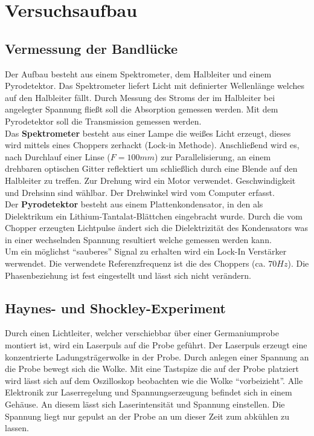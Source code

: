 \documentclass[12pt]{article}
\begin{document}
\section{Versuchsaufbau}
\subsection{Vermessung der Bandlücke}
Der Aufbau besteht aus einem Spektrometer, dem Halbleiter und einem Pyrodetektor.
Das Spektrometer liefert Licht mit definierter Wellenlänge welches auf den Halbleiter fällt. Durch Messung des Stroms der im Halbleiter bei angelegter Spannung fließt soll die Absorption gemessen werden. Mit dem Pyrodetektor soll die Transmission gemessen werden.\\

Das \textbf{Spektrometer} besteht aus einer Lampe die weißes Licht erzeugt, dieses wird mittels eines Choppers zerhackt (Lock-in Methode). Anschließend wird es, nach Durchlauf einer Linse ($F = 100mm$) zur Parallelisierung, an einem drehbaren optischen Gitter reflektiert um schließlich durch eine Blende auf den Halbleiter zu treffen. Zur Drehung wird ein Motor verwendet. Geschwindigkeit und Drehsinn sind wählbar. Der Drehwinkel wird vom Computer erfasst.\\

Der \textbf{Pyrodetektor} besteht aus einem Plattenkondensator, in den als Dielektrikum ein Lithium-Tantalat-Blättchen eingebracht wurde. Durch die vom Chopper erzeugten Lichtpulse ändert sich die Dielektrizität des Kondensators was in einer wechselnden Spannung resultiert welche gemessen werden kann.\\

Um ein möglichst "`sauberes"' Signal zu erhalten wird ein Lock-In Verstärker werwendet.
Die verwendete Referenzfrequenz ist die des Choppers (ca. $70Hz$). Die Phasenbeziehung ist fest eingestellt und lässt sich nicht verändern.

\subsection{Haynes- und Shockley-Experiment}
Durch einen Lichtleiter, welcher verschiebbar über einer Germaniumprobe montiert ist, wird ein Laserpuls auf die Probe geführt.
Der Laserpuls erzeugt eine konzentrierte Ladungsträgerwolke in der Probe. Durch anlegen einer Spannung an die Probe bewegt sich die Wolke. Mit eine Tastspize die auf der Probe platziert wird lässt sich auf dem Oszilloskop beobachten wie die Wolke "`vorbeizieht"'. Alle Elektronik zur Laserregelung und Spannungserzeugung befindet sich in einem Gehäuse. An diesem lässt sich Laserintensität und Spannung einstellen. Die Spannung liegt nur gepulst an der Probe an um dieser Zeit zum abkühlen zu lassen.\\
\end{document}
